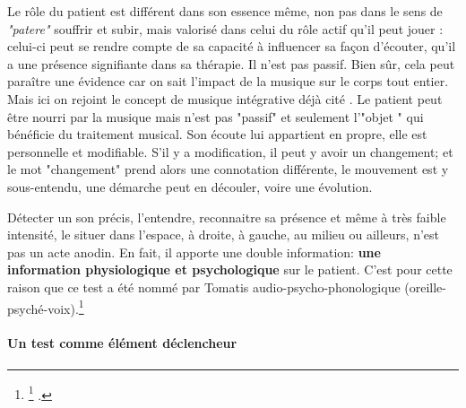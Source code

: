 	
	Le rôle du patient est différent dans son
        essence même, non pas dans le sens de\textit{ "patere"
        }souffrir et subir, mais valorisé dans celui du rôle actif
        qu'il peut jouer : celui-ci peut se rendre compte de sa
        capacité à influencer sa façon d'écouter, qu'il a une présence
        signifiante dans sa thérapie.  Il n'est pas passif. Bien sûr,
        cela peut paraître une évidence car on sait l'impact de la
        musique sur le corps tout entier. Mais ici on rejoint  le
        concept de musique intégrative déjà cité \autocite[Cf.] {vrait_musicotherapie_2018}. Le patient peut être nourri par la musique mais n'est pas "passif" et seulement l'"objet " qui bénéficie du traitement musical. Son  écoute lui appartient en propre, elle est personnelle et modifiable. S'il y a modification, il peut y avoir un changement; et le mot "changement" prend alors une connotation différente,  le mouvement est y  sous-entendu,  une démarche peut en découler, voire une évolution. 




 Détecter un son précis, l'entendre, reconnaitre sa présence et même à très
 faible intensité, le situer dans l'espace, à droite, à gauche, au
 milieu ou ailleurs, n'est pas un acte anodin. En fait,  il apporte
 une double information: \textbf{une information
   physiologique et psychologique} sur le patient.
 C'est pour cette raison que ce test a été nommé par Tomatis
 audio-psycho-phonologique (oreille-psyché-voix).\footnote{\footnote{Avec le professeur Tomatis: formation suivie dès 1995, Boulevard de Courcelles, Centre de l'écoute 
Tomatis à Paris; puis en 2009/11/13/15 avec V. Gas, V. Drouot et J.P. Granier, formateurs et consultants. Source: site internet officiel: \cite{tomatis.com}.}
.}

        
\paragraph{Un test comme élément déclencheur}

